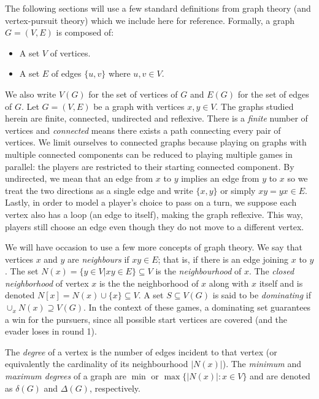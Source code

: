 The following sections will use a few standard definitions from graph theory (and vertex-pursuit theory) which we include here for reference.
Formally, a graph $G = (V, E)$ is composed of:

\begin{itemize}
\item A set $V$ of vertices.
\item A set $E$ of edges $\{u,v\}$ where $u, v \in V$.
\end{itemize}

We also write $V(G)$ for the set of vertices of $G$ and $E(G)$ for the set of edges of $G$.
Let $G = (V,E)$ be a graph with vertices $x,y \in V$.
The graphs studied herein are finite, connected, undirected and reflexive.
There is a \textit{finite} number of vertices and \textit{connected} means there exists a path connecting every pair of vertices.
We limit ourselves to connected graphs because playing on graphs with multiple connected components can be reduced to playing multiple games in parallel: the players are restricted to their starting connected component. By undirected, we mean that an edge from $x$ to $y$ implies an edge from $y$ to $x$ so we treat the two directions as a single edge and write $\{x,y\}$ or simply $xy = yx \in E$.
Lastly, in order to model a player's choice to pass on a turn, we suppose each vertex also has a loop (an edge to itself), making the graph reflexive. This way, players still choose an edge even though they do not move to a different vertex.

We will have occasion to use a few more concepts of graph theory. We say that vertices $x$ and $y$ are \textit{neighbours} if $xy \in E$; that is, if there is an edge joining $x$ to $y$.
The set $N(x) = \{ y \in V | xy \in E \} \subseteq V$ is the \textit{neighbourhood} of $x$.
The \textit{closed neighborhood} of vertex $x$ is the the neighborhood of $x$ along with $x$ itself and is denoted $N[x] = N(x) \cup \{x\} \subseteq V$. A set $S \subseteq V(G)$ is said to be \textit{dominating} if $\cup_x N(x) \supseteq V(G)$. In the context of these games, a dominating set guarantees a win for the pursuers, since all possible start vertices are covered (and the evader loses in round 1). 

The \textit{degree} of a vertex is the number of edges incident to that vertex (or equivalently the
cardinality of its neighbourhood $\lvert N(x) \rvert$). The \textit{minimum} and \textit{maximum
degrees} of a graph are $\min \text{ or } \max \{ \lvert N(x)\rvert : x \in V\}$ and are denoted as $\delta(G)$ and $\Delta(G)$, respectively.

